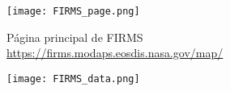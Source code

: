 \begin{frame}
    \Huge
\end{frame}

\begin{frame}
    \renewcommand{\yourowntexcol}{black}
    \begin{figure}[H]
        \centering
        \texttt{[image: FIRMS\_page.png]}
        \caption{Página principal de FIRMS \url{https://firms.modaps.eosdis.nasa.gov/map/}}
    \end{figure}
\end{frame}

\begin{frame}
    \begin{figure}[H]
        \centering
        \texttt{[image: FIRMS\_data.png]}
    \end{figure}
\end{frame}

